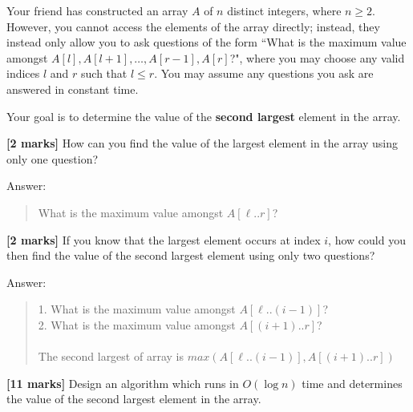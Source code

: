 \documentclass{article}
\begin{document}
\setcounter{question}{3}

\begin{Question}
Your friend has constructed an array $A$ of $n$ distinct integers, where $n \ge 2$. However, you cannot access the elements of the array directly; instead, they instead only allow you to ask questions of the form ``What is the maximum value amongst $A[l], A[l+1], \ldots, A[r-1], A[r]$?", where you may choose any valid indices $l$ and $r$ such that $l \le r$. You may assume any questions you ask are answered in constant time.

Your goal is to determine the value of the \textbf{second largest} element in the array.

\begin{Subquestion}
\textbf{[2 marks]} How can you find the value of the largest element in the array using only one question?

\begin{answer}
Answer:
\begin{quote}
    What is the maximum value amongst $A[\ell..r]$?\\
\end{quote}
\end{answer}
\end{Subquestion}

\begin{Subquestion}
\textbf{[2 marks]} If you know that the largest element occurs at index $i$, how could you then find the value of the second largest element using only two questions?

\begin{answer}
Answer:
\begin{quote}
1. What is the maximum value amongst $A[\ell..(i-1)]$?\\
2. What is the maximum value amongst $A[(i+1)..r]$?\\\\
The second largest of array is $max(A[\ell..(i-1)], A[(i+1)..r])$\\
\end{quote}
\end{answer}
\end{Subquestion}

\clearpage
\begin{Subquestion}\label{second-largest}
\textbf{[11 marks]} Design an algorithm which runs in $O(\log n)$ time and determines the value of the second largest element in the array.


\end{Subquestion}
\end{Question}
\end{document}
